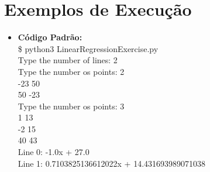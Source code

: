 \documentclass{article}
\begin{document}
\section{Exemplos de Execução}
\begin{itemize}
    \item \textbf{Código Padrão:}\\
        \$ python3 LinearRegressionExercise.py\\
        Type the number of lines: 2\\
        Type the number os points: 2\\
        -23 50\\
        50 -23\\
        Type the number os points: 3\\
        1 13\\
        -2 15\\
        40 43\\
        
        Line 0: -1.0x + 27.0\\
        Line 1: 0.7103825136612022x + 14.431693989071038\\


\end{itemize}
\end{document}

